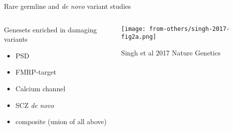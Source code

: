 \documentclass[usenames,dvipsnames]{beamer}
\begin{document}
\begin{frame}[label=rare]{Rare germline and \textit{de novo} variant studies}
\begin{columns}[t]
\begin{column}{0.5\textwidth}
Genesets enriched in \alert{damaging} variants
\begin{itemize}
\item PSD
\item FMRP-target
\item Calcium channel
\item SCZ \textit{de novo}
\item composite (union of all above)
\end{itemize}
\end{column}

\begin{column}{0.5\textwidth}

\texttt{[image: from-others/singh-2017-fig2a.png]}

\tiny Singh et al 2017 Nature Genetics
\end{column}
\end{columns}
\end{frame}
\end{document}
